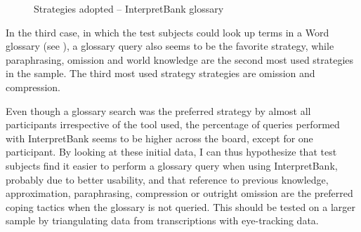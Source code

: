 \documentclass[output=paper]{langsci/langscibook}
\begin{document}
\begin{figure}[p]
\caption{Strategies adopted -- InterpretBank glossary} 
\label{fig:prandi:17}
\end{figure}

In the third case, in which the test subjects could look up terms in a Word glossary (see ), a glossary query also seems to be the favorite strategy, while paraphrasing, omission and world knowledge are the second most used strategies in the sample. The third most used strategy strategies are omission and compression. 


Even though a glossary search was the preferred strategy by almost all participants irrespective of the tool used, the percentage of queries performed with InterpretBank seems to be higher across the board, except for one participant. By looking at these initial data, I can thus hypothesize that test subjects find it easier to perform a glossary query when using InterpretBank, probably due to better usability, and that reference to previous knowledge, approximation, paraphrasing, compression or outright omission are the preferred coping tactics when the glossary is not queried. This should be tested on a larger sample by triangulating data from transcriptions with eye-tracking data. 
\end{document}
